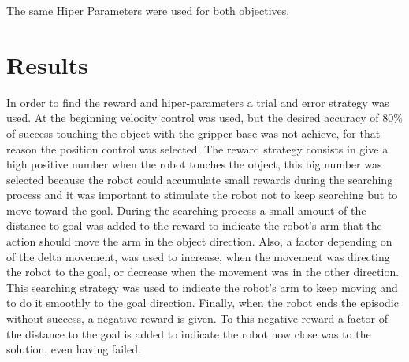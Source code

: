 \documentclass[10pt,journal,compsoc]{IEEEtran}
\begin{document}
The same Hiper Parameters were used for both objectives. 

\section{Results}

In order to find the reward and hiper-parameters a trial and error strategy was used. At the beginning velocity control was used, but the desired accuracy of 80\% of success touching the object with the gripper base was not achieve, for that reason the position control was selected. The reward strategy consists in give a high positive number when the robot touches the object, this big number was selected because the robot could accumulate small rewards during the searching process and it was important to stimulate the robot not to keep searching but to move toward the goal. During the searching process a small amount of the distance to goal was added to the reward to indicate the robot's arm that the action should move the arm in the object direction. Also, a factor depending on of the delta movement, was used to increase, when the movement was directing the robot to the goal, or decrease when the movement was in the other direction. This searching strategy was used to indicate the robot's arm to keep moving and to do it smoothly  to the goal direction. Finally, when the robot ends the episodic without success, a negative reward is given. To this negative reward a factor of the distance to the goal is added to indicate the robot how close was to the solution, even having failed.
\end{document}
